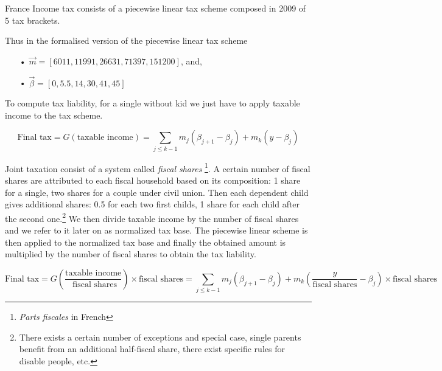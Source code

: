 France Income tax consists of a piecewise linear tax scheme composed in 2009
of 5 tax brackets.

\begin{table}[ptb]
\caption{France 2009 Income Tax Schedule}
\centering
{}\end{table}


Thus in the formalised version of the piecewise linear tax scheme 
\begin{itemize}
\item[•] $\vec{m} = [6011, 11991, 26631,71397, 151200]$,  and, 
\item[•] $\vec{\beta} = [0, 5.5, 14,30, 41, 45]$
\end{itemize}
\medskip 

To compute tax liability, for a single without kid we just have to apply
taxable income to the tax scheme.%

\[
\text{Final tax} = G( \text{taxable income}) = \sum_{j \leq k -1} m_{j}%
(\beta_{j+1} - \beta_{j} ) + m_{k} (y - \beta_{j} )
\]


Joint taxation consist of a system called \emph{fiscal shares}
\footnote{\emph{Parts fiscales} in French}. A certain number of fiscal shares
are attributed to each fiscal household based on its composition: 1 share for
a single, two shares for a couple under civil union. Then each dependent child
gives additional shares: 0.5 for each two first childs, 1 share for each child
after the second one.\footnote{There exists a certain number of exceptions and
special case, single parents benefit from an additional half-fiscal share,
there exist specific rules for disable people, etc.} We then divide taxable
income by the number of fiscal shares and we refer to it later on as
normalized tax base. The piecewise linear scheme is then applied to the
normalized tax base and finally the obtained amount is multiplied by the
number of fiscal shares to obtain the tax liability.

\begin{dmath*}
\text{Final tax} = G \left( \frac{ \text{taxable income}}{ \text{ fiscal shares}} \right) \times \text{fiscal shares} = \sum_{j \leq k -1} m_j(\beta_{j+1} - \beta_j ) + m_k \left(\frac{y}{\text{fiscal shares}} - \beta_j \right) \times \text{fiscal shares}
\end{dmath*}


